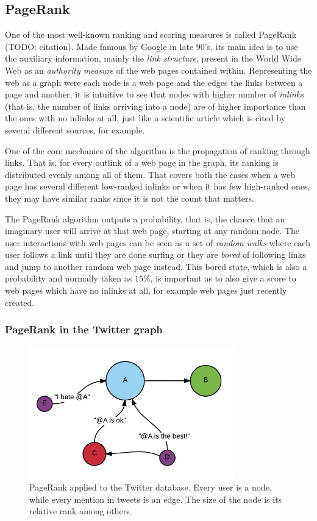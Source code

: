 \subsection{PageRank}

One of the most well-known ranking and scoring measures is called PageRank (TODO: citation). Made famous by Google in late 90's, its main idea is to use the auxiliary information, mainly the \emph{link structure}, present in the World Wide Web as an \emph{authority measure} of the web pages contained within. Representing the web as a graph were each node is a web page and the edges the links between a page and another, it is intuitive to see that nodes with higher number of \emph{inlinks} (that is, the number of links arriving into a node) are of higher importance than the ones with no inlinks at all, just like a scientific article which is cited by several different sources, for example.

One of the core mechanics of the algorithm is the propagation of ranking through links. That is, for every outlink of a web page in the graph, its ranking is distributed evenly among all of them. That covers both the cases when a web page has several different low-ranked inlinks or when it has few high-ranked ones,  they may have similar ranks since it is not the count that matters.

The PageRank algorithm outputs a probability, that is, the chance that an imaginary user will arrive at that web page, starting at any random node. The user interactions with web pages can be seen as a set of \emph{random walks} where each user follows a link until they are done surfing or they are \emph{bored} of following links and jump to another random web page instead. This bored state, which is also a probability  and normally taken as $15\%$, is important as to also give a score to web pages which have no inlinks at all,  for example web pages just recently created.

\subsubsection{PageRank in the Twitter graph}

\begin{figure}[t]
\centering
\includegraphics[width=3.5in]{images/PageRank.png}
\caption{PageRank applied to the Twitter database. Every user is a node, while every mention in tweets is an edge. The size of the node is its relative rank among others.}
\label{fig:pagerank}
\end{figure}

